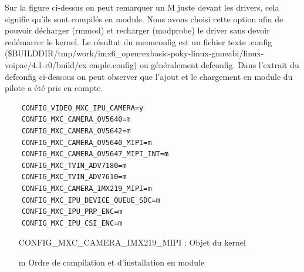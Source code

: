 Sur la figure ci-dessus on peut remarquer un M juste devant les drivers, cela signifie qu’ils
sont compilés en module. Nous avons choisi cette option afin de pouvoir décharger
(rmmod) et recharger (modprobe) le driver sans devoir redémarrer le kernel.
Le résultat du menuconfig est un fichier texte .config
(\$BUILDDIR/tmp/work/imx6\_openrexbasic-poky-linux-gnueabi/linux-voipac/4.1-r0/build/ex
emple.config) ou généralement defconfig. Dans l’extrait du defconfig ci-dessous on peut
observer que l’ajout et le chargement en module du pilote a été pris en compte.

\begin{lstlisting}
    CONFIG_VIDEO_MXC_IPU_CAMERA=y
    CONFIG_MXC_CAMERA_OV5640=m
    CONFIG_MXC_CAMERA_OV5642=m
    CONFIG_MXC_CAMERA_OV5640_MIPI=m
    CONFIG_MXC_CAMERA_OV5647_MIPI_INT=m
    CONFIG_MXC_TVIN_ADV7180=m
    CONFIG_MXC_TVIN_ADV7610=m
    CONFIG_MXC_CAMERA_IMX219_MIPI=m
    CONFIG_MXC_IPU_DEVICE_QUEUE_SDC=m
    CONFIG_MXC_IPU_PRP_ENC=m
    CONFIG_MXC_IPU_CSI_ENC=m
\end{lstlisting}

\begin{itemize}
    \item[CONFIG\_MXC\_CAMERA\_IMX219\_MIPI : ] Objet du kernel
    \item[m] Ordre de compilation et d'installation en module
\end{itemize}

